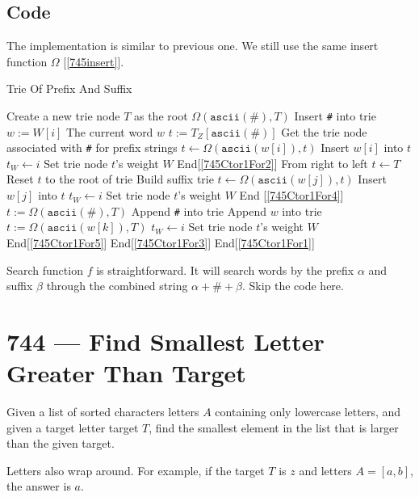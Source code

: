 \documentclass[a4paper,12pt]{article}
\begin{document}
\subsection{Code}
The implementation is similar to previous one. We still use the same insert function $\Omega$ [\ref{745insert}].
\begin{algorithm}[H]
\caption{Trie Of Prefix And Suffix}
\begin{algorithmic}[1]
\State Create a new trie node $T$ as the root
\State $\Omega(\texttt{ascii}(\texttt{\#}), T)$ \Comment Insert \texttt{\#} into trie
 \label{745Ctor1For1}
\State $w:=W[i]$ \Comment The current word $w$
\State $t:=T_Z[\texttt{ascii}(\texttt{\#})]$ \Comment Get the trie node associated with \texttt{\#} for prefix strings
 \label{745Ctor1For2}
\State $t\gets \Omega(\texttt{ascii}(w[i]), t)$ \Comment Insert $w[i]$ into $t$
\State $t_W \gets i$ \Comment Set trie node $t$'s weight $W$
\EndFor \Comment End[\ref{745Ctor1For2}]
 \Comment From right to left \label{745Ctor1For3}
\State $t\gets T$ \Comment Reset $t$ to the root of trie
 \Comment Build suffix trie \label{745Ctor1For4}
\State $t\gets \Omega(\texttt{ascii}(w[j]), t)$ \Comment Insert $w[j]$ into $t$
\State $t_W \gets i$ \Comment Set trie node $t$'s weight $W$
\EndFor \Comment End [\ref{745Ctor1For4}]
\State $t:=\Omega(\texttt{ascii}(\texttt{\#}), T)$ \Comment Append \texttt{\#} into trie
 \Comment Append $w$ into trie \label{745Ctor1For5}
\State $t:=\Omega(\texttt{ascii}(w[k]), T)$ 
\State $t_W \gets i$ \Comment Set trie node $t$'s weight $W$
\EndFor \Comment End[\ref{745Ctor1For5}]
\EndFor \Comment End[\ref{745Ctor1For3}]
\EndFor \Comment End[\ref{745Ctor1For1}]
\EndProcedure
\end{algorithmic}
\end{algorithm}
Search function $f$ is straightforward. It will search words by the prefix $\alpha$ and suffix $\beta$ through the combined string $\alpha + \texttt{\#} + \beta$. Skip the code here. 

\section{744 --- Find Smallest Letter Greater Than Target}
Given a list of sorted characters letters $A$ containing only lowercase letters, and given a target letter target $T$, find the smallest element in the list that is larger than the given target.
\par
Letters also wrap around. For example, if the target $T$ is $z$ and letters $A = [a, b]$, the answer is $a$.
\end{document}
